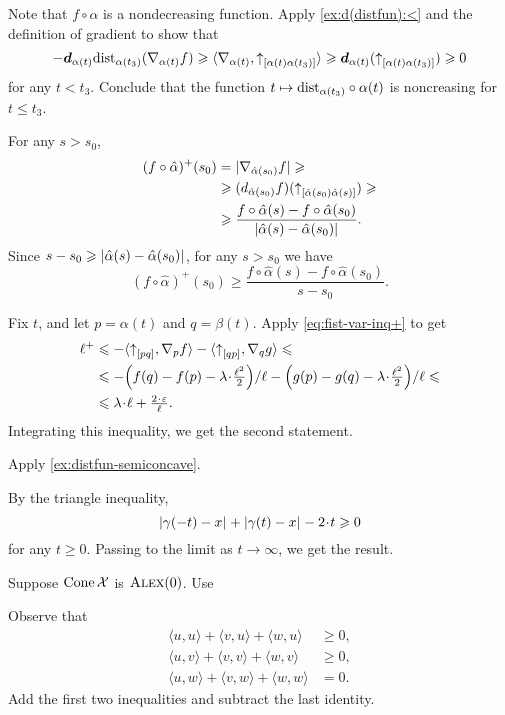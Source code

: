 Note that $f\circ\alpha$ is a nondecreasing function.
Apply \ref{ex:d(distfun):<} and the definition of gradient to show that
\[
-\bm{d}_{\alpha(t)}\mathrm{dist}_{\alpha(t_3)}(\nabla_{\alpha(t)}f)
\geqslant
\langle \nabla_{\alpha(t)},{\uparrow}_{[{\alpha(t)}{\alpha(t_3)}]}\rangle
\geqslant
\bm{d}_{\alpha(t)}({\uparrow}_{[{\alpha(t)}{\alpha(t_3)}]})
\geqslant0
\]
for any $t<t_3$.
Conclude that the function 
$t\mapsto \mathrm{dist}_{\alpha(t_3)}\circ\alpha(t)$ is noncreasing for $t\le t_3$.

For any $s>s_0$,
\begin{align*}
(f\circ\hat\alpha)^+(s_0)&=|\nabla_{\hat\alpha(s_0)}f|
\ge
\\
&\ge
(d_{\hat\alpha(s_0)}f)(\dir{\hat\alpha(s_0)}{\hat\alpha(s)})
\ge
\\
&\ge
\frac{f\circ\hat\alpha(s)-f\circ\hat\alpha(s_0)}{\dist{\hat\alpha(s)}{\hat\alpha(s_0)}{}}.
\end{align*} 
Since $s-s_0\ge\dist{\hat\alpha(s)}{\hat\alpha(s_0)}{}$, for any $s>s_0$ we have 
\[(f\circ\hat\alpha)^+(s_0)\ge
\frac{f\circ\hat\alpha(s)-f\circ\hat\alpha(s_0)}{s-s_0}.\]

Fix $t$, and let $p=\alpha(t)$ and $q=\beta(t)$.
Apply \ref{eq:fist-var-inq+} to get
\begin{align*}
 \ell^+
&\le -\<\dir{p}{q},\nabla_{p}f\>
-\<\dir{q}{p},\nabla_{q}g\>
\le
\\
&\le -{\left({f(q)}-{f(p)}-\lambda\cdot\tfrac{\ell^2}2\right)}/{\ell}
-{\left({g(p)}-{g(q)}-\lambda\cdot\tfrac{\ell^2}2\right)}/{\ell}\le
\\
&\le \lambda\cdot\ell+\tfrac{2\cdot\eps}{\ell}.
\end{align*}
Integrating this inequality, we get the second statement.

 Apply \ref{ex:distfun-semiconcave}.

 By the triangle inequality, 
\[\dist{\gamma(-t)}{x}{}+\dist{\gamma(t)}{x}{}-2\cdot t\ge 0\]
for any $t\ge 0$.
Passing to the limit as $t\to\infty$, we get the result.

 Suppose $\mathop{\rm Cone}\nolimits\mathcal{X}$ is $\textsc{Alex}(0)$.
Use 

Observe that
\begin{align*}
\langle u,u\rangle+\langle v,u\rangle+\langle w,u\rangle &\ge 0,
\\
\langle u,v\rangle+\langle v,v\rangle+\langle w,v\rangle &\ge 0,
\\
\langle u,w\rangle+\langle v,w\rangle+\langle w,w\rangle &= 0.
\end{align*}
Add the first two inequalities and subtract the last identity.


